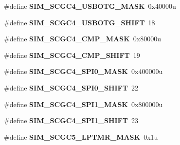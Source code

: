 \begin{DoxyCompactItemize}
\#define {\bfseries S\+I\+M\+\_\+\+S\+C\+G\+C4\+\_\+\+U\+S\+B\+O\+T\+G\+\_\+\+M\+A\+SK}~0x40000u
\item 
\mbox{\label{group___s_i_m___register___masks_ga5d0dd9f68667fdf71fce1b0a6ae990dd}} 
\#define {\bfseries S\+I\+M\+\_\+\+S\+C\+G\+C4\+\_\+\+U\+S\+B\+O\+T\+G\+\_\+\+S\+H\+I\+FT}~18
\item 
\mbox{\label{group___s_i_m___register___masks_gad7304bdb8fc46deb77c5e444e56fae40}} 
\#define {\bfseries S\+I\+M\+\_\+\+S\+C\+G\+C4\+\_\+\+C\+M\+P\+\_\+\+M\+A\+SK}~0x80000u
\item 
\mbox{\label{group___s_i_m___register___masks_ga1072a5419bbeaf4081c6c4a5ca7cf86c}} 
\#define {\bfseries S\+I\+M\+\_\+\+S\+C\+G\+C4\+\_\+\+C\+M\+P\+\_\+\+S\+H\+I\+FT}~19
\item 
\mbox{\label{group___s_i_m___register___masks_ga0b29e4c88f0494317c3cd447fb363f5e}} 
\#define {\bfseries S\+I\+M\+\_\+\+S\+C\+G\+C4\+\_\+\+S\+P\+I0\+\_\+\+M\+A\+SK}~0x400000u
\item 
\mbox{\label{group___s_i_m___register___masks_ga4fd9f9a3ee78e060c7042597043c336c}} 
\#define {\bfseries S\+I\+M\+\_\+\+S\+C\+G\+C4\+\_\+\+S\+P\+I0\+\_\+\+S\+H\+I\+FT}~22
\item 
\mbox{\label{group___s_i_m___register___masks_ga40dc8e1653911d8e12103bc4ef9d66d1}} 
\#define {\bfseries S\+I\+M\+\_\+\+S\+C\+G\+C4\+\_\+\+S\+P\+I1\+\_\+\+M\+A\+SK}~0x800000u
\item 
\mbox{\label{group___s_i_m___register___masks_ga0bc6038c3a8a17fec28bc6980ad293e4}} 
\#define {\bfseries S\+I\+M\+\_\+\+S\+C\+G\+C4\+\_\+\+S\+P\+I1\+\_\+\+S\+H\+I\+FT}~23
\item 
\mbox{\label{group___s_i_m___register___masks_ga6f63b73e0ad63163df381c795d583cc1}} 
\#define {\bfseries S\+I\+M\+\_\+\+S\+C\+G\+C5\+\_\+\+L\+P\+T\+M\+R\+\_\+\+M\+A\+SK}~0x1u
\item 
\mbox{\label{group___s_i_m___register___masks_ga9b3669f3f4f380e18133785d6356c56c}} 

\end{DoxyCompactItemize}

